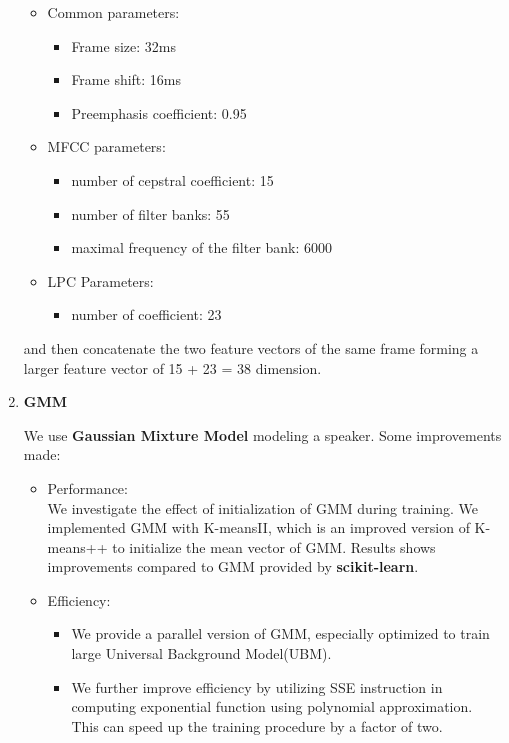 \begin{enumerate}
			\begin{itemize}
				\item Common parameters:
					\begin{itemize}
						\item Frame size: 32ms
						\item Frame shift: 16ms
						\item Preemphasis coefficient: 0.95
					\end{itemize}
				\item MFCC parameters:
					\begin{itemize}
						\item number of cepstral coefficient: 15
						\item number of filter banks: 55
						\item maximal frequency of the filter bank: 6000
					\end{itemize}
				\item LPC Parameters:
					\begin{itemize}
						\item number of coefficient: 23
					\end{itemize}
			\end{itemize}

			and then concatenate the two feature vectors of the same frame forming
			a larger feature vector of 15 + 23 = 38 dimension.

		\item \textbf{GMM}

			We use \textbf{Gaussian Mixture Model} modeling a speaker. Some improvements made:
			\begin{itemize}
				\item Performance: \\
					We investigate the effect of initialization of GMM during
					training. We implemented GMM with
					K-meansII\cite{bahmani2012scalable}, which is an improved
					version of K-means++\cite{arthur2007k} to initialize the
					mean vector of GMM. Results shows improvements compared
					to GMM provided by \textbf{scikit-learn\cite{scikit-learn}}.
				\item Efficiency:
					\begin{itemize}
						\item We provide a parallel version of GMM, especially
							optimized to train large Universal Background Model(UBM).
						\item We further improve efficiency by utilizing
							SSE instruction in computing exponential function
							using polynomial approximation. This can speed up
							the training procedure by a factor of two.
					\end{itemize}
                \end{itemize}


\end{enumerate}
